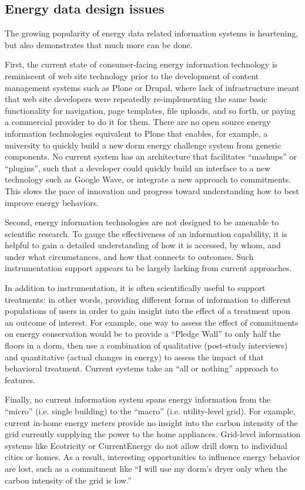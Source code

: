 \subsection{Energy data design issues}

The growing popularity of energy data related information systems is
heartening, but also demonstrates that much more can be done. 

First, the current state of consumer-facing energy information technology
is reminiscent of web site technology prior to the development of content
management systems such as Plone or Drupal, where lack of infrastructure
meant that web site developers were repeatedly re-implementing the same
basic functionality for navigation, page templates, file uploads, and so
forth, or paying a commercial provider to do it for them.  There are no
open source energy information technologies equivalent to Plone that
enables, for example, a university to quickly build a new dorm energy
challenge system from generic components.  No current system has an
architecture that facilitates ``mashups'' or ``plugins'', such that a
developer could quickly build an interface to a new technology such as
Google Wave, or integrate a new approach to commitments. This slows the
pace of innovation and progress toward understanding how to best improve
energy behaviors.

Second, energy information technologies are not designed to be amenable to
scientific research.  To gauge the effectiveness of an information
capability, it is helpful to gain a detailed understanding of how it is
accessed, by whom, and under what circumstances, and how that connects
to outcomes.  Such instrumentation support appears to be largely lacking
from current approaches.

In addition to instrumentation, it is often scientifically useful to
support treatments: in other words, providing different forms of
information to different populations of users in order to gain insight into
the effect of a treatment upon an outcome of interest. For example, one way
to assess the effect of commitments on energy conservation would be to
provide a ``Pledge Wall'' to only half the floors in a dorm, then use a
combination of qualitative (post-study interviews) and quantitative (actual
changes in energy) to assess the impact of that behavioral
treatment. Current systems take an ``all or nothing'' approach to
features. 

Finally, no current information system spans energy information from the ``micro''
(i.e. single building) to the ``macro'' (i.e. utility-level grid).  For
example, current in-home energy meters provide no insight into the carbon
intensity of the grid currently supplying the power to the home appliances.
Grid-level information systems like Ecotricity or CurrentEnergy do not
allow drill down to individual cities or homes.  As a result, interesting
opportunities to influence energy behavior are lost, such as a commitment
like ``I will use my dorm's dryer only when the carbon intensity of the grid is low.''

